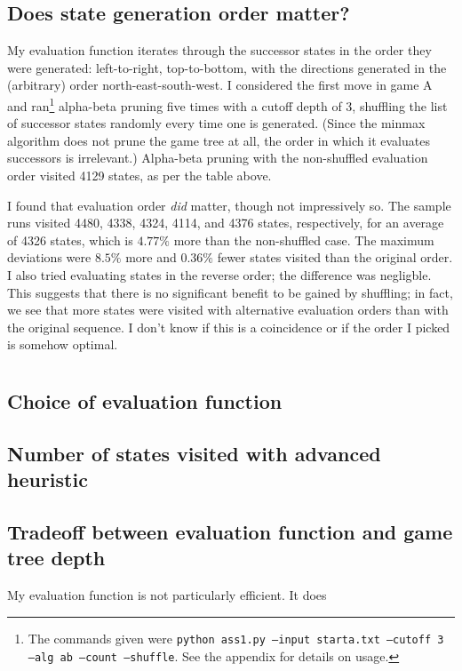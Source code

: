 \documentclass[letterpaper, 12pt]{article}
\numberwithin{theorem}{section}
\begin{document}
\subsection{Does state generation order matter?}
My evaluation function iterates through the successor states in the order they were generated: left-to-right, top-to-bottom, with the directions generated in the (arbitrary) order north-east-south-west. I considered the first move in game A and ran\footnote{The commands given were \texttt{python ass1.py --input starta.txt --cutoff 3 --alg ab --count --shuffle}. See the appendix for details on usage.} alpha-beta pruning five times with a cutoff depth of 3, shuffling the list of successor states randomly every time one is generated. (Since the minmax algorithm does not prune the game tree at all, the order in which it evaluates successors is irrelevant.) Alpha-beta pruning with the non-shuffled evaluation order visited 4129 states, as per the table above. 

I found that evaluation order \emph{did} matter, though not impressively so. The sample runs visited 4480, 4338, 4324, 4114, and 4376 states, respectively, for an average of 4326 states, which is $4.77\%$ more than the non-shuffled case. The maximum deviations were $8.5\%$ more and $0.36\%$ fewer states visited than the original order. I also tried evaluating states in the reverse order; the difference was negligble. This suggests that there is no significant benefit to be gained by shuffling; in fact, we see that more states were visited with alternative evaluation orders than with the original sequence. I don't know if this is a coincidence or if the order I picked is somehow optimal.


\section{}
\subsection{Choice of evaluation function}

\subsection{Number of states visited with advanced heuristic}

\subsection{Tradeoff between evaluation function and game tree depth}
My evaluation function is not particularly efficient. It does 
\end{document}
